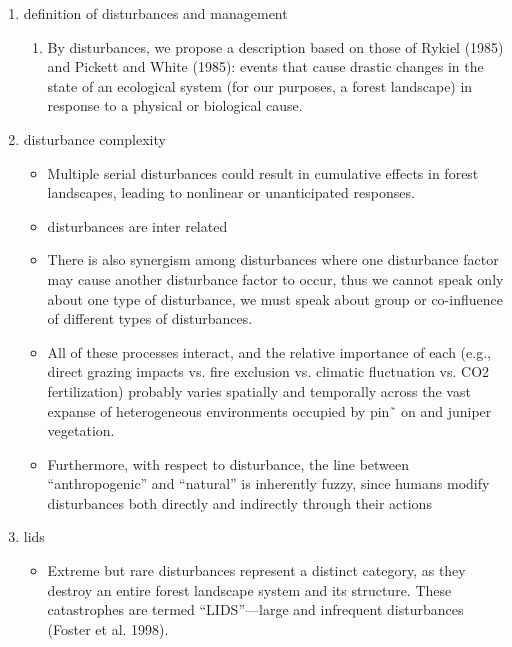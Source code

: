\documentclass{article}
\begin{document}
\begin{enumerate}
    \item definition of disturbances and management
    \begin{enumerate}
        \item By disturbances, we propose a description based on those of Rykiel (1985) and Pickett and White (1985): events that cause drastic changes in the state of an ecological system (for our purposes, a forest landscape) in response to a physical or biological cause. \cite{white1985natural} \cite{rykiel1985towards}
    \end{enumerate}
    \item disturbance complexity
        \begin{itemize}
            \item Multiple serial disturbances could result in cumulative effects in forest landscapes, leading to nonlinear or unanticipated responses. \cite{perera2015simulation}
            \item disturbances are inter related \cite{keane2015exploring}
            \item There is also synergism among disturbances where one disturbance factor may cause another disturbance factor to occur, thus we cannot speak only about one type of disturbance, we must speak about group or co-influence of different types of disturbances. \cite{mandre_environmental_2011}
            \item All of these processes interact, and the relative importance of each (e.g., direct grazing impacts vs. fire exclusion vs. climatic fluctuation vs. CO2 fertilization) probably varies spatially and temporally across the vast expanse of heterogeneous environments occupied by pin˜ on and juniper vegetation. \cite{romme2009historical} 
            \item Furthermore, with respect to disturbance, the line between “anthropogenic” and “natural” is inherently fuzzy, since humans modify disturbances both directly and indirectly through their actions \cite{perera2015simulation}
        \end{itemize}
    \item lids
        \begin{itemize}
            \item Extreme but rare disturbances represent a distinct category, as they destroy an entire forest landscape system and its structure. These catastrophes are termed “LIDS”—large and infrequent disturbances (Foster et al. 1998). \cite{foster1998landscape}

\end{itemize}
\end{enumerate}
\end{document}
